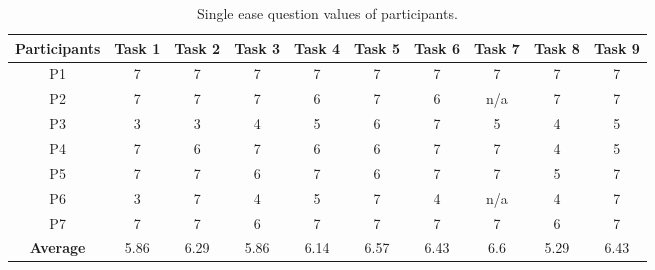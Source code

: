 \begin{table}
    \centering
    \caption*{Single ease question values of participants.}\label{table:seq_scoring}
    \vspace{1em}
    \begin{tabular}{c c c c c c c c c c}
        \hline
        \textbf{Participants} & \textbf{Task 1} & \textbf{Task 2} & \textbf{Task 3} & \textbf{Task 4} & \textbf{Task 5} & \textbf{Task 6} & \textbf{Task 7} & \textbf{Task 8} & \textbf{Task 9} \\
        \hline
        P1 & 7 & 7 & 7 & 7 & 7 & 7 & 7 & 7 & 7 \\
        \hline
        P2 & 7 & 7 & 7 & 6 & 7 & 6 & n/a & 7 & 7 \\
        \hline
        P3 & 3 & 3 & 4 & 5 & 6 & 7 & 5 & 4 & 5 \\
        \hline
        P4 & 7 & 6 & 7 & 6 & 6 & 7 & 7 & 4 & 5 \\
        \hline
        P5 & 7 & 7 & 6 & 7 & 6 & 7 & 7 & 5 & 7 \\
        \hline
        P6 & 3 & 7 & 4 & 5 & 7 & 4 & n/a & 4 & 7 \\
        \hline
        P7 & 7 & 7 & 6 & 7 & 7 & 7 & 7 & 6 & 7 \\
        \hline
        \textbf{Average} & 5.86 & 6.29 & 5.86 & 6.14 & 6.57 & 6.43 & 6.6 & 5.29 & 6.43 \\
        \hline
    \end{tabular}
\end{table}

